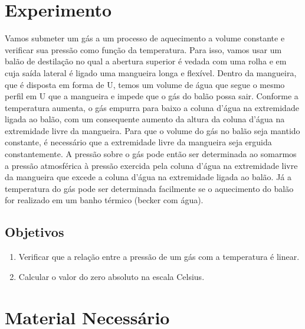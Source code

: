 \section{Experimento}

Vamos submeter um gás a um processo de aquecimento a volume constante e verificar sua pressão como função da temperatura. Para isso, vamos usar um balão de destilação no qual a abertura superior é vedada com uma rolha e em cuja saída lateral é ligado uma mangueira longa e flexível. Dentro da mangueira, que é disposta em forma de U, temos um volume de água que segue o mesmo perfil em U que a mangueira e impede que o gás do balão possa sair. Conforme a temperatura aumenta, o gás empurra para baixo a coluna d'água na extremidade ligada ao balão, com um consequente aumento da altura da coluna d'água na extremidade livre da mangueira. Para que o volume do gás no balão seja mantido constante, é necessário que a extremidade livre da mangueira seja erguida constantemente. A pressão sobre o gás pode então ser determinada ao somarmos a pressão atmosférica à pressão exercida pela coluna d'água na extremidade livre da mangueira que excede a coluna d'água na extremidade ligada ao balão. Já a temperatura do gás pode ser determinada facilmente se o aquecimento do balão for realizado em um banho térmico (becker com água).

\subsection{Objetivos}
\label{Sec:ObjetivosZeroAbsoluto}

\begin{enumerate}
	\item Verificar que a relação entre a pressão de um gás com a temperatura é linear.
	\item Calcular o valor do zero absoluto na escala Celsius.
\end{enumerate}

\pagebreak
\section{Material Necessário}

